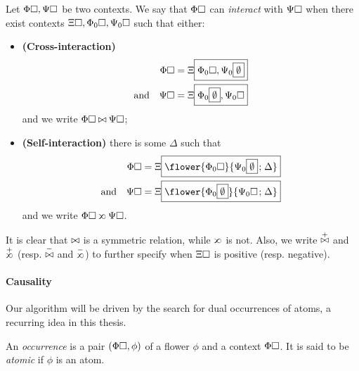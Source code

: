 
\begin{definition}[Interaction]
  
  Let $\Phi\square, \Psi\square$ be two contexts. We say that $\Phi\square$ can
  \emph{interact} with $\Psi\square$ when there exist contexts $\Xi\square,
  \Phi_0\square, \Psi_0\square$ such that either:
  \begin{itemize}
    \item \textbf{(Cross-interaction)}
    \begin{align*}
      \Phi\square &= \Xi\fbox{$\Phi_0\square, \Psi_0\fbox{$\emptyset$}$} \\
      \text{and}\quad \Psi\square &= \Xi\fbox{$\Phi_0\fbox{$\emptyset$}, \Psi_0\square$}
    \end{align*}
    and we write $\Phi\square \mathbin{\bowtie} \Psi\square$;
    \item \textbf{(Self-interaction)} there is some $\Delta$ such that
    \begin{align*}
      \Phi\hole &= \Xi\select{\flower{\Phi_0\hole}{\Psi_0\select{\emptyset} \sep \Delta}} \\
      \text{and}\quad \Psi\hole &= \Xi\select{\flower{\Phi_0\select{\emptyset}}{\Psi_0\hole \sep \Delta}}
    \end{align*}
    and we write $\Phi\hole \sinter \Psi\hole$.
  \end{itemize}
  It is clear that $\mathbin{\bowtie}$ is a symmetric relation, while $\sinter$ is not.
  Also, we write $\cinterpos$ and $\sinterpos$ (resp. $\cinterneg$ and
  $\sinterneg$) to further specify when $\Xi\square$ is positive (resp. negative).
\end{definition}

\paragraph{Causality}

Our algorithm will be driven by the search for dual occurrences of atoms, a
recurring idea in this thesis.

\begin{definition}[Occurrence]
  
  An \emph{occurrence} is a pair $(\Phi\square, \phi)$ of a flower $\phi$ and a
  context $\Phi\square$. It is said to be \emph{atomic} if $\phi$ is an atom.
\end{definition}

